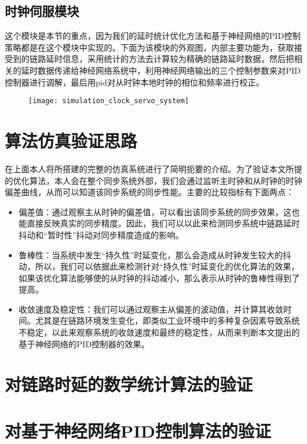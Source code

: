 \subsection{时钟伺服模块}
这个模块是本节的重点，因为我们的延时统计优化方法和基于神经网络的PID控制策略都是在这个模块中实现的。下面为该模块的外观图，内部主要功能为，获取接受到的链路延时信息，采用统计的方法去计算较为精确的链路延时数据，然后把相关的延时数据传递给神经网络系统中，利用神经网络输出的三个控制参数来对PID控制器进行调解，最后用pid对从时钟本地时钟的相位和频率进行校正。
\begin{figure}[!hbp]
  \centering
  \begin{minipage}[b]{1\textwidth}
    \captionstyle{\centering}
    \centering
    \texttt{[image: simulation\_clock\_servo\_system]}
  \end{minipage}     
\end{figure}

\section{算法仿真验证思路}
在上面本人将所搭建的完整的仿真系统进行了简明扼要的介绍。为了验证本文所提的优化算法，本人会在整个同步系统外部，我们会通过监听主时钟和从时钟的时钟偏差曲线，从而可以知道该同步系统的同步性能。主要的比较指标有下面两点：
\begin{itemize}[noitemsep,topsep=0pt,parsep=0pt,partopsep=0pt]
	\item 偏差值：通过观察主从时钟的偏差值，可以看出该同步系统的同步效果，这也能直接反映真实的同步精度。因此，我们可以以此来检测同步系统中链路延时抖动和“暂时性”抖动对同步精度造成的影响。
	\item 鲁棒性：当系统中发生“持久性”时延变化，那么会造成从时钟发生较大的抖动，所以，我们可以依据此来检测针对“持久性”时延变化的优化算法的效果，如果该优化算法能够使的从时钟的抖动减小，那么表示从时钟的鲁棒性得到了提高。
	\item 收敛速度及稳定性：我们可以通过观察主从偏差的波动值，并计算其收敛时间。尤其是在链路环境发生变化，即类似工业环境中的多种复杂因素导致系统不稳定，以此来观察系统的收敛速度和最终的稳定性，从而来判断本文提出的基于神经网络的PID控制器的效果。
\end{itemize}

\section{对链路时延的数学统计算法的验证}

\section{对基于神经网络PID控制算法的验证}
